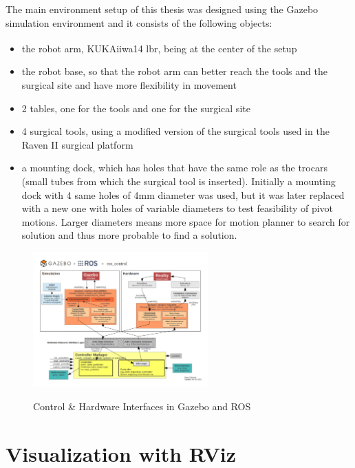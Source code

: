 The main environment setup of this thesis was designed using the Gazebo simulation environment and 
it consists of the following objects:
\begin{itemize}
\item the robot arm, KUKA\textsuperscript \textregistered iiwa14 lbr, being at the center of the setup
\item the robot base, so that the robot arm can better reach the tools and the surgical site and have more flexibility in movement
\item 2 tables, one for the tools and one for the surgical site
\item 4 surgical tools, using a modified version of the surgical tools used in the Raven II surgical platform
\item a mounting dock, which has holes that have the same role as the trocars (small tubes from 
which the surgical tool is inserted). Initially a mounting dock with 4 same holes of 4mm diameter was used, but it was later replaced with a new one with holes of variable diameters to test feasibility of pivot motions. Larger diameters means more space for motion planner to search for solution and thus more probable to find a solution.
\end{itemize}

\begin{center}
\begin{figure}[H]
\centering
\includegraphics[width=0.6\textwidth]{images/Gazebo_ros_transmission.png}\\
\caption{Control \& Hardware Interfaces in Gazebo and ROS}
\end{figure}
\end{center}


\section{Visualization with RViz}

